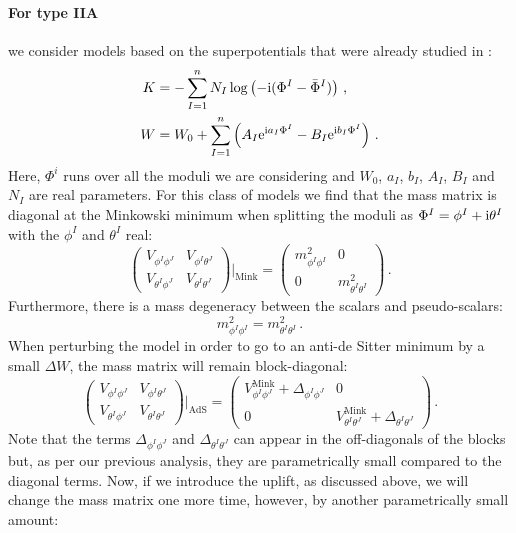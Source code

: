 \documentclass[a4paper,12pt]{report}
\newcommand{\be}{\begin{equation}}
\newcommand{\ee}{\end{equation}}
\newcommand{\bea}{\begin{equation}\begin{aligned}}
\newcommand{\eea}{\end{aligned}\end{equation}}
\def\rmi{{\rm i}}
\def\rme{{\rm e}}
\begin{document}
\paragraph{For type IIA} we consider models based on the superpotentials that were already studied in \cite{Kallosh:2019zgd}:
\bea 
K &= - \sum_{I=1}^n N_I \log \left( -\rmi (\Phi^I - \bar{\Phi}^I )\right)\,,\\
W &= W_0 + \sum_{I=1}^n \left( A_I \rme^{\rmi a_I \Phi^I} - B_I \rme^{\rmi b_I \Phi^I} \right)\,.
\label{eq:IIAKW}
\eea 
Here, $\Phi^i$ runs over all the moduli we are considering and $W_0$, $a_I$, $b_I$, $A_I$, $B_I$ and $N_I$ are real parameters. For this class of models we find that the mass matrix is diagonal at the Minkowski minimum when splitting the moduli as $\Phi^I = \phi^I + \rmi \theta^I$ with the $\phi^I$ and $\theta^I$ real:
\be 
\begin{pmatrix}
V_{\phi^I\phi^J} & V_{\phi^I \theta^J}\\
V_{\theta^I\phi^J} & V_{\theta^I \theta^J}
\end{pmatrix}\Bigg|_{\text{Mink}}
=
\begin{pmatrix}
m^2_{\phi^I\phi^I} & 0\\
0 & m^2_{\theta^I \theta^I}
\end{pmatrix}\,.
\ee
Furthermore, there is a mass degeneracy between the scalars and pseudo-scalars:
\be 
m^2_{\phi^I\phi^I} = m^2_{\theta^I \theta^I}\,.
\ee
When perturbing the model in order to go to an anti-de Sitter minimum by a small $\Delta W$, the mass matrix will remain block-diagonal:
\be 
\begin{pmatrix}
V_{\phi^I\phi^J} & V_{\phi^I \theta^J}\\
V_{\theta^I\phi^J} & V_{\theta^I \theta^J}
\end{pmatrix}\Bigg|_{\text{AdS}}
=
\begin{pmatrix}
V^{\text{Mink}}_{\phi^I\phi^J} + \Delta_{\phi^I \phi^J}& 0\\
0 & V^{\text{Mink}}_{\theta^I \theta^J}+\Delta_{\theta^I \theta^J}
\end{pmatrix}\,.
\ee
Note that the terms $\Delta_{\phi^I \phi^J}$ and $\Delta_{\theta^I \theta^J}$ can appear in the off-diagonals of the blocks but, as per our previous analysis, they are parametrically small compared to the diagonal terms. Now, if we introduce the uplift, as discussed above, we will change the mass matrix one more time, however, by another parametrically small amount:
\end{document}
